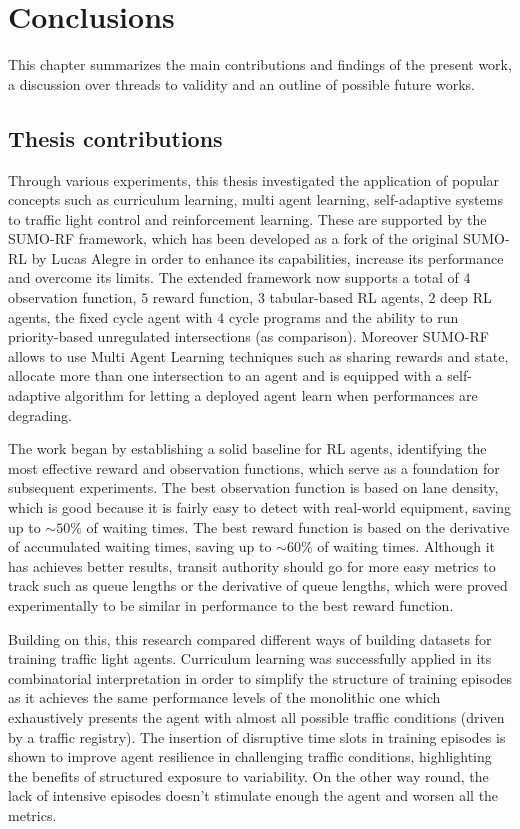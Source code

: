 \chapter{Conclusions}
\label{chapter:conclusions}

This chapter summarizes the main contributions and findings of the present work, a discussion over threads to validity and an outline of possible future works.

\section{Thesis contributions}

Through various experiments, this thesis investigated the application of popular concepts such as curriculum learning, multi agent learning, self-adaptive systems to traffic light control and reinforcement learning.
These are supported by the SUMO-RF framework, which has been developed as a fork of the original SUMO-RL by Lucas Alegre in order to enhance its capabilities, increase its performance and overcome its limits.
The extended framework now supports a total of $4$ observation function, $5$ reward function, $3$ tabular-based RL agents, $2$ deep RL agents, the fixed cycle agent with $4$ cycle programs and the ability to run priority-based unregulated intersections (as comparison).
Moreover SUMO-RF allows to use Multi Agent Learning techniques such as sharing rewards and state, allocate more than one intersection to an agent and is equipped with a self-adaptive algorithm for letting a deployed agent learn when performances are degrading.

The work began by establishing a solid baseline for RL agents, identifying the most effective reward and observation functions, which serve as a foundation for subsequent experiments.
The best observation function is based on lane density, which is good because it is fairly easy to detect with real-world equipment, saving up to $\sim 50\%$ of waiting times.
The best reward function is based on the derivative of accumulated waiting times, saving up to $\sim 60\%$ of waiting times.
Although it has achieves better results, transit authority should go for more easy metrics to track such as queue lengths or the derivative of queue lengths, which were proved experimentally to be similar in performance to the best reward function.

Building on this, this research compared different ways of building datasets for training traffic light agents.
Curriculum learning was successfully applied in its combinatorial interpretation in order to simplify the structure of training episodes as it achieves the same performance levels of the monolithic one which exhaustively presents the agent with almost all possible traffic conditions (driven by a traffic registry).
The insertion of disruptive time slots in training episodes is shown to improve agent resilience in challenging traffic conditions, highlighting the benefits of structured exposure to variability.
On the other way round, the lack of intensive episodes doesn't stimulate enough the agent and worsen all the metrics.

